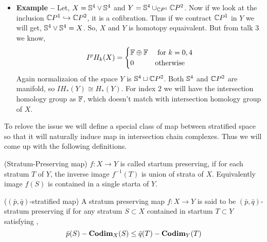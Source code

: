 \documentclass[11pt]{article}
\begin{document}
\begin{itemize}
    \item[] \textbf{Example -- } Let, $X = \mathbb{S}^4 \vee \mathbb{S}^4$ and $Y = \mathbb{S}^4 \cup_{\mathbb{C} P^1 } \mathbb{C} P^2$. Now if we look at the inclusion $\mathbb{C} P^1 \hookrightarrow \mathbb{C} P^2$, it is a cofibration. Thus if we contract $\mathbb{C} P^1$ in $Y$ we will get, $\mathbb{S}^4 \vee \mathbb{S}^4 = X$. So, $X$ and $Y$ is homotopy equaivalent. But from talk $3$ we know, \begin{align*}
        I^{p}H_{k}(X) = \begin{cases}
            \mathbb{F} \oplus \mathbb{F}  & \text{ for } k = 0,4 \\
            0 & \text{otherwise}
        \end{cases}
    \end{align*}
    Again normalizaion of the space $Y$ is $\mathbb{S}^4 \sqcup \mathbb{C} P^2$. Both $\mathbb{S}^4$ and $\mathbb{C} P^2$ are manifold, so $IH_{\ast}(Y) \cong H_{\ast}(Y)$. For index $2$ we will have the intersection homology group as $\mathbb{F}$, which doesn't match with intersection homology group of $X$.
\end{itemize}

\noindent To relove the issue we will define a special class of map between stratified space so that it will naturally induce map in intersection chain complexes. Thus we will come up with the following definitions. 

\begin{Def}{(Stratum-Preserving map)}{}
      $f : X \to Y$ is called startum preserving, if for each stratum $T$ of $Y$, the inverse image $f^{-1}(T)$ is union of strata of $X$. Equivalently image $f(S)$ is contained in a single starta of $Y$.
\end{Def}

\begin{Def}{($(\bar{p},\bar{q})$-stratified map)}{}
    A stratum preserving map $f : X \to Y$ is said to be $(\bar{p},\bar{q})$-stratum preserving if for any stratum $S\subset X$ contained in startum $T \subset Y$ satisfying , $$\bar{p}(S)-\mathbf{Codim}_X(S) \leq \bar{q}(T) - \mathbf{Codim}_{Y}(T)$$
\end{Def}
\end{document}
